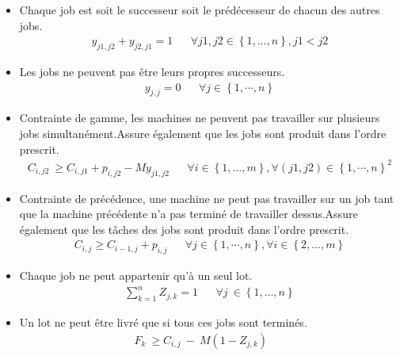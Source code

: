 \documentclass{article}
\begin{document}
        \begin{itemize}
            \item 
                Chaque job est soit le successeur soit le prédécesseur de chacun des autres jobs.
                \begin{align}
                    y_{j1,j2}+y_{j2,j1}=1   &&
                    \forall j1,j2\in\left\{1,\dotsc,n\right\}, j1<j2
                \end{align}
        
            \item 
                Les jobs ne peuvent pas être leurs propres successeurs.
                \begin{align}
                    y_{j,j}=0 &&
                    \forall j\in \left\{1,\cdots, n\right\}
                \end{align}
            \item
        	    Contrainte de gamme, les machines ne peuvent pas travailler sur plusieurs jobs simultanément.Assure également que les jobs sont produit dans l'ordre prescrit.
        	    \begin{align}
                    C_{i,j2}\ \geq C_{i,j1}+p_{i,j2}-My_{j1,j2} &&
                    \forall i\in\left\{1,\dotsc,m\right\}, \forall\left(j1,j2\right)\in\left\{1,\cdots,n\right\}^2
        	    \end{align}
            \item
            	Contrainte de précédence, une machine ne peut pas travailler sur un job tant que la machine précédente n’a pas terminé de travailler dessus.Assure également que les tâches des jobs sont produit dans l'ordre prescrit.
            	\begin{align}
                    C_{i,j}\geq C_{i-1,j}+p_{i,j} &&
                    \forall j\in\left\{1,\cdots,n\right\},\forall i\in\left\{2,\dotsc,m\right\}
            	\end{align}
            \item
            	Chaque job ne peut appartenir qu’à un seul lot.
            	\begin{align}
                    \sum_{k=1}^{n}Z_{j,k}=1 &&
                    \forall j\ \in\left\{1,\dotsc,n \right\}
            	\end{align}
            \item
            	Un lot ne peut être livré que si tous ces jobs sont terminés.
            	\begin{align}
                    F_k\ \geq C_{i,j}\ -\ M\left(1-Z_{j,k}\right) &&

\end{align}
\end{itemize}
\end{document}

